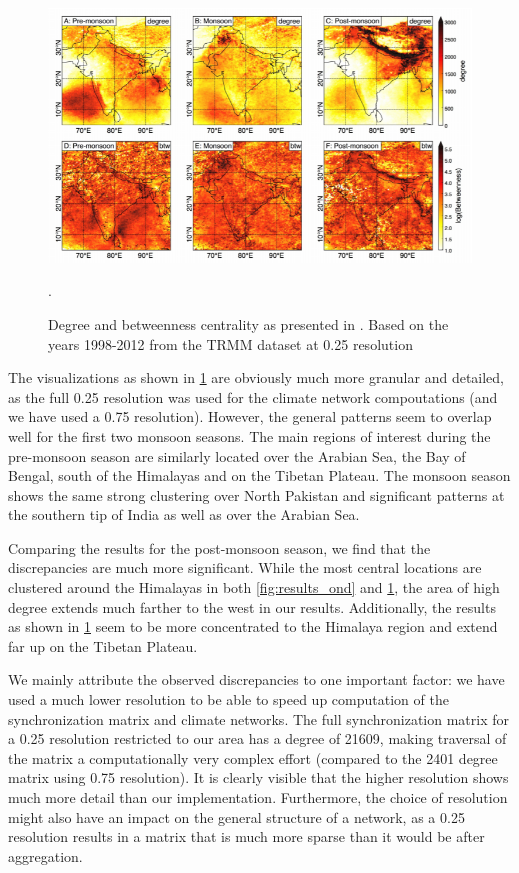 \begin{figure}[H]
  \centering
  \includegraphics[width=\textwidth]{./99_appendix/img/results_stolbova.png}
  \caption{Degree and betweenness centrality as presented in \citet{Stolbova.2015}. Based on the years 1998-2012 from the TRMM dataset at {0.25\degree} resolution}.
  \label{fig:results_stolbova}
\end{figure}

The visualizations as shown in \cref{fig:results_stolbova} are obviously much more granular and detailed, as the full {0.25\degree} resolution was used for the climate network compoutations (and we have used a {0.75\degree} resolution). However, the general patterns seem to overlap well for the first two monsoon seasons. The main regions of interest during the pre-monsoon season are similarly located over the Arabian Sea, the Bay of Bengal, south of the Himalayas and on the Tibetan Plateau. The monsoon season shows the same strong clustering over North Pakistan and significant patterns at the southern tip of India as well as over the Arabian Sea.

Comparing the results for the post-monsoon season, we find that the discrepancies are much more significant. While the most central locations are clustered around the Himalayas in both \cref{fig:results_ond} and \cref{fig:results_stolbova}, the area of high degree extends much farther to the west in our results. Additionally, the results as shown in \cref{fig:results_stolbova} seem to be more concentrated to the Himalaya region and extend far up on the Tibetan Plateau.

We mainly attribute the observed discrepancies to one important factor: we have used a much lower resolution to be able to speed up computation of the synchronization matrix and climate networks. The full synchronization matrix for a {0.25\degree} resolution restricted to our area has a degree of 21609, making traversal of the matrix a computationally very complex effort (compared to the 2401 degree matrix using {0.75\degree} resolution). It is clearly visible that the higher resolution shows much more detail than our implementation. Furthermore, the choice of resolution might also have an impact on the general structure of a network, as a {0.25\degree} resolution results in a matrix that is much more sparse than it would be after aggregation.

